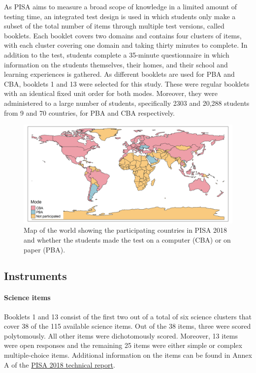 \documentclass{article}
\begin{document}
As PISA aims to measure a broad scope of knowledge in a limited amount of testing time, an integrated test design is used in which students only make a subset of the total number of items through multiple test versions, called booklets. Each booklet covers two domains and contains four clusters of items, with each cluster covering one domain and taking thirty minutes to complete. In addition to the test, students complete a 35-minute questionnaire in which information on the students themselves, their homes, and their school and learning experiences is gathered. As different booklets are used for PBA and CBA, booklets 1 and 13 were selected for this study. These were regular booklets with an identical fixed unit order for both modes. Moreover, they were administered to a large number of students, specifically 2303 and 20,288 students from 9 and 70 countries, for PBA and CBA respectively. 

\begin{figure} [!ht]
    \centering
    \includegraphics[scale = 0.58]{mode_map.png}
    \caption{Map of the world showing the participating countries in PISA 2018 and whether the students made the test on a computer (CBA) or on paper (PBA).}
    \label{fig:landenkaart}
\end{figure}

\subsection{Instruments}

\paragraph{Science items}

Booklets 1 and 13 consist of the first two out of a total of six science clusters that cover 38 of the 115 available science items. Out of the 38 items, three were scored polytomously. All other items were dichotomously scored. Moreover, 13 items were open responses and the remaining 25 items were either simple or complex multiple-choice items. Additional information on the items can be found in Annex A of the \href{https://www.oecd.org/pisa/data/pisa2018technicalreport/}{PISA 2018 technical report}.
\end{document}
